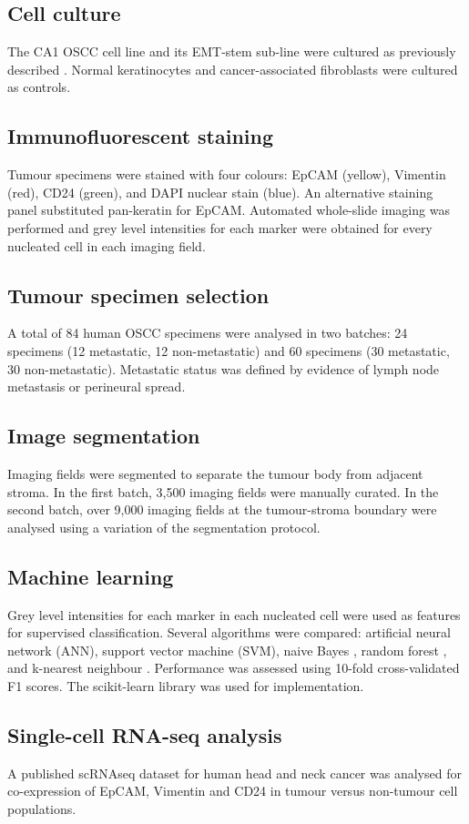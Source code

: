 \documentclass[11pt]{article}
\begin{document}
\subsection{Cell culture}
The CA1 OSCC cell line and its EMT-stem sub-line were cultured as previously described \citep{biddle2016}. Normal keratinocytes and cancer-associated fibroblasts were cultured as controls.

\subsection{Immunofluorescent staining}
Tumour specimens were stained with four colours: EpCAM (yellow), Vimentin (red), CD24 (green), and DAPI nuclear stain (blue). An alternative staining panel substituted pan-keratin for EpCAM. Automated whole-slide imaging was performed and grey level intensities for each marker were obtained for every nucleated cell in each imaging field.

\subsection{Tumour specimen selection}
A total of 84 human OSCC specimens were analysed in two batches: 24 specimens (12 metastatic, 12 non-metastatic) and 60 specimens (30 metastatic, 30 non-metastatic). Metastatic status was defined by evidence of lymph node metastasis or perineural spread.

\subsection{Image segmentation}
Imaging fields were segmented to separate the tumour body from adjacent stroma. In the first batch, 3,500 imaging fields were manually curated. In the second batch, over 9,000 imaging fields at the tumour-stroma boundary were analysed using a variation of the segmentation protocol.

\subsection{Machine learning}
Grey level intensities for each marker in each nucleated cell were used as features for supervised classification. Several algorithms were compared: artificial neural network (ANN), support vector machine (SVM), naive Bayes \citep{rish2005}, random forest \citep{deparis2009}, and k-nearest neighbour \citep{benhamou1975}. Performance was assessed using 10-fold cross-validated F1 scores. The scikit-learn library \citep{pedregosa2011} was used for implementation.

\subsection{Single-cell RNA-seq analysis}
A published scRNAseq dataset for human head and neck cancer \citep{puram2017} was analysed for co-expression of EpCAM, Vimentin and CD24 in tumour versus non-tumour cell populations.


\end{document}
